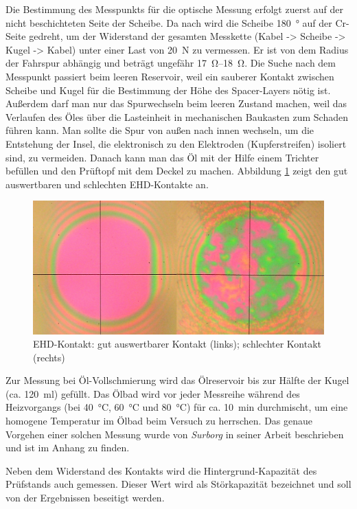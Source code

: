 Die Bestimmung des Messpunkts für die optische Messung erfolgt zuerst auf der nicht beschichteten Seite der Scheibe.
Da nach wird die Scheibe \SI{180}{\degree} auf der Cr-Seite gedreht, um der Widerstand der gesamten Messkette (Kabel -> Scheibe -> Kugel -> Kabel) unter einer Last von \SI{20}{\newton} zu vermessen.
Er ist von dem Radius der Fahrspur abhängig und beträgt ungefähr \SIrange{17}{18}{\ohm}.
Die Suche nach dem Messpunkt passiert beim leeren Reservoir, weil ein sauberer Kontakt zwischen Scheibe und Kugel für die Bestimmung der Höhe des Spacer-Layers nötig ist.
Außerdem darf man nur das Spurwechseln beim leeren Zustand machen, weil das Verlaufen des Öles über die Lasteinheit in mechanischen Baukasten zum Schaden führen kann.
Man sollte die Spur von außen nach innen wechseln, um die Entstehung der Insel, die elektronisch zu den Elektroden (Kupferstreifen) isoliert sind, zu vermeiden.
Danach kann man das Öl mit der Hilfe einem Trichter befüllen und den Prüftopf mit dem Deckel zu machen.
Abbildung \ref{fig:ehd_kontakt} zeigt den gut auswertbaren und schlechten EHD-Kontakte an.
\begin{figure}[htb]
    \centering
    \includegraphics[width=0.7\linewidth]{./images/ehd_kontakt.jpg}
    \caption{EHD-Kontakt: gut auswertbarer Kontakt (links); schlechter Kontakt (rechts)}
    \label{fig:ehd_kontakt}
\end{figure}

Zur Messung bei Öl-Vollschmierung wird das Ölreservoir bis zur Hälfte der Kugel (ca. \SI{120}{\ml}) gefüllt.
Das Ölbad wird vor jeder Messreihe während des Heizvorgangs (bei \SI{40}{\degreeCelsius}, \SI{60}{\degreeCelsius} und \SI{80}{\degreeCelsius}) für ca. \SI{10}{\minute} durchmischt, um eine homogene Temperatur im Ölbad beim Versuch zu herrschen.
Das genaue Vorgehen einer solchen Messung wurde von \textit{Surborg} in seiner Arbeit \cite{surborg_2007} beschrieben und ist im Anhang zu finden.

Neben dem Widerstand des Kontakts wird die Hintergrund-Kapazität des Prüfstands auch gemessen.
Dieser Wert wird als Störkapazität bezeichnet und soll von der Ergebnissen beseitigt werden.

